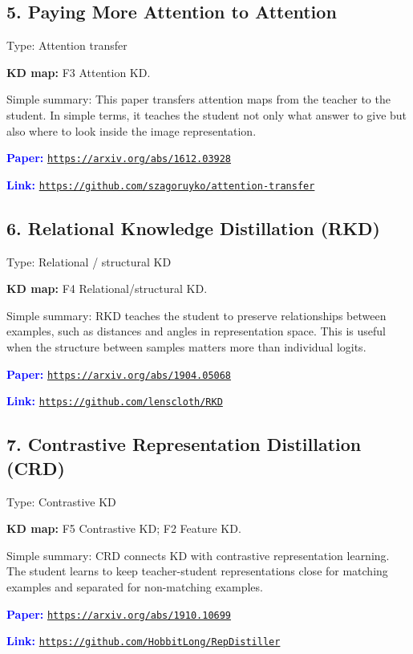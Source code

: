 \documentclass[10pt]{article}
\begin{document}
\subsection*{5. Paying More Attention to Attention}
Type: Attention transfer\par
\textbf{KD map:} F3 Attention KD.\par
Simple summary: This paper transfers attention maps from the teacher to the student. In simple terms, it teaches the student not only what answer to give but also where to look inside the image representation.\par
\textcolor{blue}{\textbf{Paper:}} \href{https://arxiv.org/abs/1612.03928}{\nolinkurl{https://arxiv.org/abs/1612.03928}}\par
\textcolor{blue}{\textbf{Link:}} \href{https://github.com/szagoruyko/attention-transfer}{\nolinkurl{https://github.com/szagoruyko/attention-transfer}}\par

\subsection*{6. Relational Knowledge Distillation (RKD)}
Type: Relational / structural KD\par
\textbf{KD map:} F4 Relational/structural KD.\par
Simple summary: RKD teaches the student to preserve relationships between examples, such as distances and angles in representation space. This is useful when the structure between samples matters more than individual logits.\par
\textcolor{blue}{\textbf{Paper:}} \href{https://arxiv.org/abs/1904.05068}{\nolinkurl{https://arxiv.org/abs/1904.05068}}\par
\textcolor{blue}{\textbf{Link:}} \href{https://github.com/lenscloth/RKD}{\nolinkurl{https://github.com/lenscloth/RKD}}\par

\subsection*{7. Contrastive Representation Distillation (CRD)}
Type: Contrastive KD\par
\textbf{KD map:} F5 Contrastive KD; F2 Feature KD.\par
Simple summary: CRD connects KD with contrastive representation learning. The student learns to keep teacher-student representations close for matching examples and separated for non-matching examples.\par
\textcolor{blue}{\textbf{Paper:}} \href{https://arxiv.org/abs/1910.10699}{\nolinkurl{https://arxiv.org/abs/1910.10699}}\par
\textcolor{blue}{\textbf{Link:}} \href{https://github.com/HobbitLong/RepDistiller}{\nolinkurl{https://github.com/HobbitLong/RepDistiller}}\par
\end{document}
